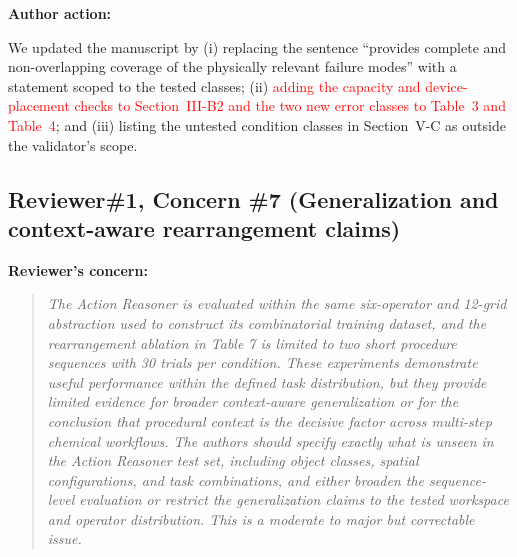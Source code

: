 \documentclass[11pt]{article}
\newcommand{\nd}[1]{\textcolor{red}{#1}}
\newif\ifshowstatus
\newcommand{\statusline}[2]{\ifshowstatus\par\noindent\textcolor{status#1}{\textbf{Status: \MakeUppercase{#1}.} #2}\par\smallskip\fi}
\newenvironment{concern}[3][pending]{\subsection*{\ifshowstatus\textcolor{status#1}{#2}\else#2\fi}\statusline{#1}{#3}\textbf{Reviewer's concern:}\begin{quote}\itshape}{\end{quote}}
\newenvironment{action}{\textbf{Author action:}\par\smallskip}{\par\bigskip\noindent\hrulefill\par\bigskip}
\begin{document}
\begin{action}
We updated the manuscript by
(i) replacing the sentence ``provides complete and non-overlapping coverage of the physically relevant failure modes'' with a statement scoped to the tested classes;
(ii) \nd{adding the capacity and device-placement checks to Section~III-B2 and the two new error classes to Table~3 and Table~4};
and (iii) listing the untested condition classes in Section~V-C as outside the validator's scope.
\end{action}

\begin{concern}[pending]{Reviewer\#1, Concern \#7 (Generalization and context-aware rearrangement claims)}{Needs B6 (unseen-level definitions verified by script) and B7 (three-step ablation); the wording restriction can be applied now.}
The Action Reasoner is evaluated within the same six-operator and 12-grid abstraction used to construct its combinatorial training dataset, and the rearrangement ablation in Table 7 is limited to two short procedure sequences with 30 trials per condition.
These experiments demonstrate useful performance within the defined task distribution, but they provide limited evidence for broader context-aware generalization or for the conclusion that procedural context is the decisive factor across multi-step chemical workflows.
The authors should specify exactly what is unseen in the Action Reasoner test set, including object classes, spatial configurations, and task combinations, and either broaden the sequence-level evaluation or restrict the generalization claims to the tested workspace and operator distribution.
This is a moderate to major but correctable issue.
\end{concern}
\end{document}
